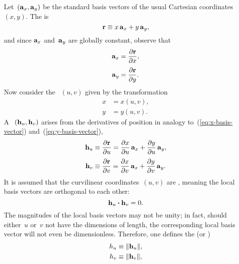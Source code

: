 Let~$(\mathop{}\!\boldsymbol{\mathrm{a}}_{x}, \mathop{}\!\boldsymbol{\mathrm{a}}_{y})$ be the standard basis vectors
of the usual Cartesian coordinates~$(x, y)$.
The  is
\begin{equation}
  \boldsymbol{\mathrm{r}} \equiv x \mathop{}\!\boldsymbol{\mathrm{a}}_{x} + y \mathop{}\!\boldsymbol{\mathrm{a}}_{y},
  \label{eq:position-vector-cartesian}
\end{equation}
and since $\mathop{}\!\boldsymbol{\mathrm{a}}_{x}$ and~$\mathop{}\!\boldsymbol{\mathrm{a}}_{y}$ are globally constant,
observe that
\begin{align}
  \basisvec{x} &= \pder{\positionvec}{x},
    \label{eq:x-basis-vector} \\[\fraclinespace]
  \basisvec{y} &= \pder{\positionvec}{y}.
    \label{eq:y-basis-vector}
\end{align}
Now consider the ~$(u, v)$
given by the transformation
\begin{align}
  x &= x (u, v), \label{eq:x-transformation-curvilinear} \\
  y &= y (u, v). \label{eq:y-transformation-curvilinear}
\end{align}
A ~$(\mathop{}\!\boldsymbol{\mathrm{h}}_{u}, \mathop{}\!\boldsymbol{\mathrm{h}}_{v})$
arises from the derivatives of position
in analogy to~(\ref{eq:x-basis-vector}) and~(\ref{eq:y-basis-vector}),
\begin{align}
  \localvec{u} &
    \defeq \pder{\positionvec}{u}
    = \pder{x}{u} \basisvec{x} + \pder{y}{u} \basisvec{y},
      \label{eq:u-local-basis-vector} \\[\fraclinespace]
  \localvec{v} &
    \defeq \pder{\positionvec}{v}
    = \pder{x}{v} \basisvec{x} + \pder{y}{v} \basisvec{y}.
      \label{eq:v-local-basis-vector}
\end{align}
It is assumed that the curvilinear coordinates~$(u, v)$ are ,
meaning the local basis vectors are orthogonal to each other:
\begin{equation}
  \mathop{}\!\boldsymbol{\mathrm{h}}_{u} \boldsymbol{\cdot} \mathop{}\!\boldsymbol{\mathrm{h}}_{v} = 0.
  \label{eq:local-basis-orthogonal}
\end{equation}
The magnitudes of the local basis vectors may not be unity;
in fact, should either~$u$ or~$v$ not have the dimensions of length,
the corresponding local basis vector will not even be dimensionless.
Therefore, one defines the 
(or )
\begin{align}
  \scalefac[u] &\defeq \norm{\localvec{u}}, \label{eq:u-scale-factor} \\
  \scalefac[v] &\defeq \norm{\localvec{v}}, \label{eq:v-scale-factor}
\end{align}
